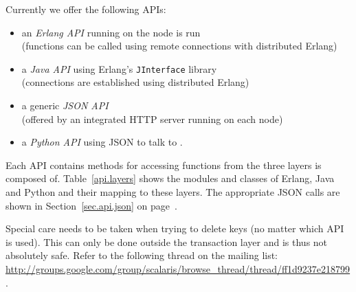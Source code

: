 \documentclass[a4paper]{scrreprt}
\newcommand{\sieheref}[1]{\ref{#1} on page~\pageref{#1}}
\newcommand{\code}[1]{\lstinline[basicstyle=\ttfamily]!#1!}
\begin{document}
Currently we offer the following APIs:
\begin{itemize}
  \item an \emph{Erlang API} running on the node \scalaris{} is run\\
        (functions can be called using remote connections with distributed
        Erlang)
  \item a \emph{Java API} using Erlang's \code{JInterface} library\\
        (connections are established using distributed Erlang)
  \item a generic \emph{JSON API}\\
        (offered by an integrated HTTP server running on each \scalaris{} node)
  \item a \emph{Python API} using JSON to talk to \scalaris{}. 
\end{itemize}

Each API contains methods for accessing functions from the three layers
\scalaris{} is composed of.
Table~\ref{api.layers} shows the modules and classes of Erlang, Java and Python
and their mapping to these layers. The appropriate JSON calls
are shown in Section~\sieheref{sec.api.json}.

Special care needs to be taken when trying to delete keys (no matter which API
is used). This can only be done outside the transaction layer and is thus not
absolutely safe. Refer to the following thread on the mailing list:
\url{http://groups.google.com/group/scalaris/browse_thread/thread/ff1d9237e218799}.
\end{document}
